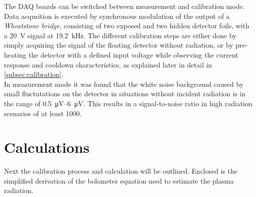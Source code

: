 \documentclass[
    aps,%
    twocolumn,%
    secnumarabic,%
    amssymb,%
    prd,%
    10pt%
    ]{revtex4-1}
\begin{document}
        The DAQ boards can be switched between measurement and calibration mode. Data acqusition is executed by synchronous modulation of the output of a \textit{Wheatstone bridge}, consisting of two exposed and two hidden detector foils, with a \mbox{\SI{20}{\volt}} signal at \mbox{\SI{19.2}{\kilo\hertz}}. The different calibration steps are either done by simply acquiring the signal of the floating detector without radiation, or by pre-heating the detector with a defined input voltage while observing the current response and cooldown characteristics, as explained later in detail in \cref{subsec:calibration}.\\%
        In measurement mode it was found that the white noise background caused by small fluctutations on the detector in situations without incident radiation is in the range of \mbox{\SIrange{0.5}{6}{\micro\volt}}. This results in a signal-to-noise ratio in high radiation scenarios of at least 1000.\\%
\section{Calculations}\label{sec:calculations}
    Next the calibration process and calculation will be outlined. Enclosed is the simplified derivation of the bolometer equation used to estimate the plasma radiation.
\end{document}
